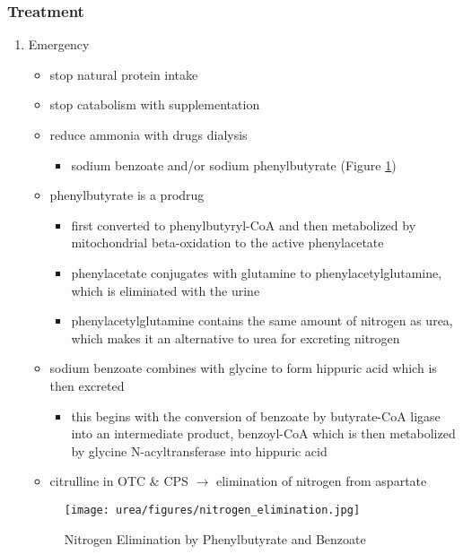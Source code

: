 \documentclass[12pt]{scrartcl}
\begin{document}
\begin{center}
\begin{center}
\subsubsection{Treatment}
\label{sec:org184c13e}
\begin{enumerate}
\item Emergency
\label{sec:org4367cdb}
\begin{itemize}
\item stop natural protein intake
\item stop catabolism with supplementation
\item reduce ammonia with drugs \textpm{} dialysis
\begin{itemize}
\item sodium benzoate and/or sodium phenylbutyrate (Figure \ref{fig:orgc36f515})
\end{itemize}

\item phenylbutyrate is a prodrug
\begin{itemize}
\item first converted to phenylbutyryl-CoA and then metabolized by mitochondrial
beta-oxidation to the active phenylacetate
\item phenylacetate conjugates with glutamine to phenylacetylglutamine,
which is eliminated with the urine
\item phenylacetylglutamine contains the same amount of nitrogen as
urea, which makes it an alternative to urea for excreting nitrogen
\end{itemize}

\item sodium benzoate combines with glycine to form hippuric acid which is
then excreted
\begin{itemize}
\item this begins with the conversion of benzoate by butyrate-CoA ligase
into an intermediate product, benzoyl-CoA which is then
metabolized by glycine N-acyltransferase into hippuric acid
\end{itemize}
\item citrulline in OTC \& CPS \(\to\) elimination of nitrogen from aspartate
\end{itemize}


\begin{figure}[htbp]
\centering
\texttt{[image: urea/figures/nitrogen\_elimination.jpg]}
\caption{\label{fig:orgc36f515}Nitrogen Elimination by Phenylbutyrate and Benzoate}
\end{figure}


\end{enumerate}
\end{center}
\end{center}
\end{document}
